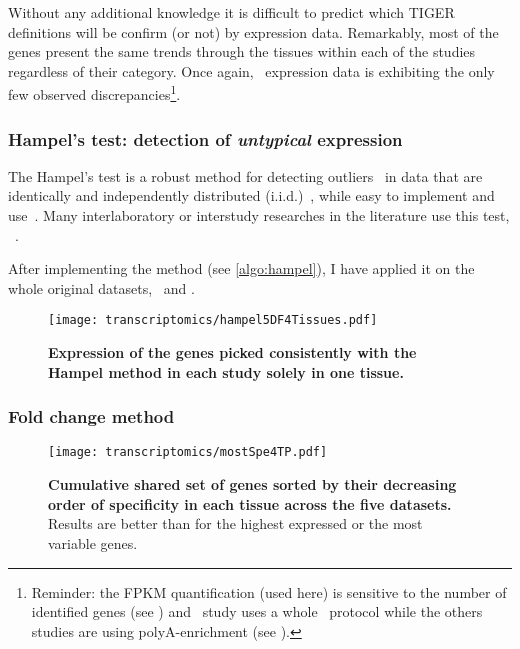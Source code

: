 Without any additional knowledge it is difficult to predict which \gls{TIGER}
definitions will be confirm (or not) by expression data.
Remarkably, most of the genes present the same trends
through the tissues within each of the studies regardless of their category.
Once again, \castle\ expression data is exhibiting
the only few observed discrepancies\footnote{Reminder:
the \gls{FPKM} quantification (used here) is sensitive
to the number of identified genes (see )
and \castle\ study uses a whole \RNA\ protocol
while the others studies are using polyA-enrichment (see ).}.

\subsubsection{Hampel's test: detection of \emph{untypical} expression}\label{subsub:Hampel}

The Hampel's test is a robust method for detecting outliers~
in data that are identically and independently distributed (i.i.d.)~,
while easy to implement and use~.
Many interlaboratory or interstudy researches in the literature use this test,
\eg~.




After implementing the method (see \cref{algo:hampel}),
I have applied it on the whole original datasets, \setOne\ and \setTwo.

\begin{figure}[!htpb]
    \texttt{[image: transcriptomics/hampel5DF4Tissues.pdf]}\centering
    \caption[Expression of the genes picked with Hampel method]{\label{fig:hampelExp}%
    \textbf{Expression of the genes picked consistently with the Hampel method
    in each study solely in one tissue.}}
\end{figure}


\subsubsection{Fold change method}\label{subsub:TisSpeGeneMethodPerso}

\begin{figure}[!htpb]
    \texttt{[image: transcriptomics/mostSpe4TP.pdf]}\centering
    \caption[Cumulative shared set of genes sorted by their specificity in each
    tissue across the 5 datasets]{\label{fig:mostSpe4T}\textbf{Cumulative shared
    set of genes sorted by their decreasing order of specificity in each tissue
    across the five datasets.} Results are better than for the highest expressed or
    the most variable genes.}
\end{figure}

